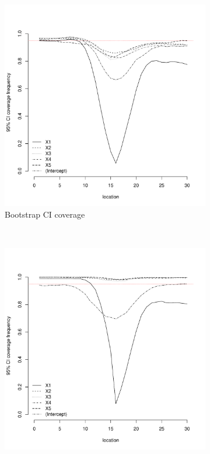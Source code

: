 \documentclass[authoryear, review, 11pt]{elsarticle}
\begin{document}
\begin{figure}
	\vspace{-30mm}
	\centering
	\begin{subfigure}[b]{0.45\textwidth}
	\centering
		\includegraphics[width=\textwidth]{../../figures/simulation/15.7.profile_bootstrap_coverage.pdf}
		\caption{Bootstrap CI coverage}
	\end{subfigure}%
	~ %
	\begin{subfigure}[b]{0.45\textwidth}
	\centering
		\includegraphics[width=\textwidth]{../../figures/simulation/15.7.profile_se_coverage.pdf}

\end{subfigure}
\end{figure}
\end{document}
